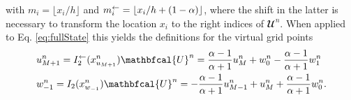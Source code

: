 with $m_i = \lfloor x_i/h\rfloor$ and $m_i^\leftarrow = \lfloor x_i/ h+(1-\alpha) \rfloor$, where the shift in the latter is necessary to transform the location $x_i$ to the right indices of $\mathbfcal{U}^n$.
When applied to Eq. \eqref{eq:fullState} this yields the definitions for the virtual grid points
\begin{subequations}\label{eq:connectionInterpol}
\begin{align}
        &u_{M+1}^n = I_2^\flip(x^n_{u_{M+1}})\mathbfcal{U}^n = \frac{\alpha - 1}{\alpha + 1}u_{M}^n + w_0^n - \frac{\alpha - 1}{\alpha + 1}w_1^n
    \label{eq:calcUMP1}\\
        &w_{-1}^n = I_2(x^n_{w_{-1}})\mathbfcal{U}^n
        =-\frac{\alpha - 1}{\alpha + 1}u_{M-1}^n + u_{M}^n+ \frac{\alpha - 1}{\alpha + 1}w_{0}^n.\label{eq:calcWM1}
\end{align}
\end{subequations}
